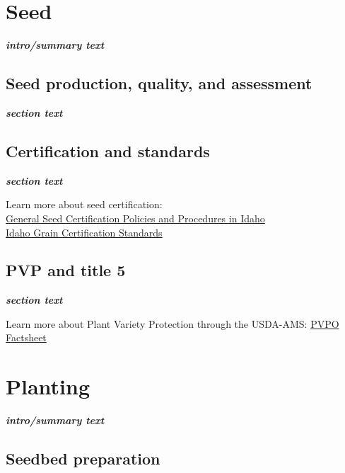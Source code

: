 \documentclass[
  letterpaper,
  DIV=11,
  numbers=noendperiod]{scrreprt}
\begin{document}

\chapter{Seed}\label{seed}

\textbf{\emph{intro/summary text}}

\section{Seed production, quality, and
assessment}\label{seed-production-quality-and-assessment}

\textbf{\emph{section text}}

\section{Certification and standards}\label{certification-and-standards}

\textbf{\emph{section text}}

Learn more about seed certification:\\
\href{https://cdn.prod.website-files.com/5c032b32fb1b863f50b40146/65f9a60f0a067bc2123b10a5_General\%20P\%26P\%20rev\%202024.pdf}{General
Seed Certification Policies and Procedures in Idaho}\\
\href{https://www.idahocrop.com/standards}{Idaho Grain Certification
Standards}

\section{PVP and title 5}\label{pvp-and-title-5}

\textbf{\emph{section text}}

Learn more about Plant Variety Protection through the USDA-AMS:
\href{https://www.ams.usda.gov/services/plant-variety-protection}{PVPO
Factsheet}


\chapter{Planting}\label{planting}

\textbf{\emph{intro/summary text}}

\section{Seedbed preparation}\label{seedbed-preparation}
\end{document}
